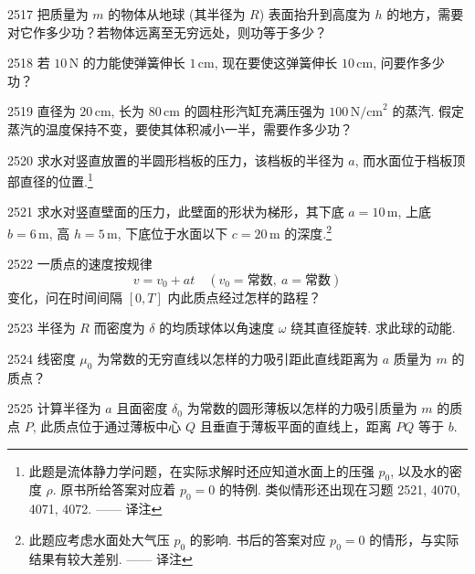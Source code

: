 \begin{prob}[M]{2517}
把质量为 $m$ 的物体从地球 (其半径为 $R$) 表面抬升到高度为 $h$ 的地方，需要对它作多少功？若物体远离至无穷远处，则功等于多少？
\end{prob}

\begin{prob}[M]{2518}
若 $10\,\mathrm{N}$ 的力能使弹簧伸长 $1\,\mathrm{cm}$, 现在要使这弹簧伸长 $10\,\mathrm{cm}$, 问要作多少功？
\end{prob}

\begin{prob}[M]{2519}
直径为 $20\,\mathrm{cm}$, 长为 $80\,\mathrm{cm}$ 的圆柱形汽缸充满压强为 $100\,\mathrm{N/cm}^2$ 的蒸汽. 假定蒸汽的温度保持不变，要使其体积减小一半，需要作多少功？
\end{prob}

\begin{prob}[M]{2520}
求水对竖直放置的半圆形档板的压力，该档板的半径为 $a$, 而水面位于档板顶部直径的位置.\footnote{此题是流体静力学问题，在实际求解时还应知道水面上的压强 $p_0$, 以及水的密度 $\rho$. 原书所给答案对应着 $p_0 = 0$ 的特例. 类似情形还出现在习题 2521, 4070, 4071, 4072. —— 译注}
\end{prob}

\begin{prob}[M]{2521}
求水对竖直壁面的压力，此壁面的形状为梯形，其下底 $a = 10\,\mathrm{m}$, 上底 $b = 6\,\mathrm{m}$, 高 $h = 5\,\mathrm{m}$, 下底位于水面以下 $c = 20\,\mathrm{m}$ 的深度.\footnote{此题应考虑水面处大气压 $p_0$ 的影响. 书后的答案对应 $p_0 = 0$ 的情形，与实际结果有较大差别. —— 译注}
\end{prob}


\begin{prob}[M]{2522}
一质点的速度按规律
\[
v = v_0 + at \quad (v_0 = \text{常数}, \ a = \text{常数})
\]
变化，问在时间间隔 $[0, T]$ 内此质点经过怎样的路程？
\end{prob}

\begin{prob}[M]{2523}
半径为 $R$ 而密度为 $\delta$ 的均质球体以角速度 $\omega$ 绕其直径旋转. 求此球的动能.
\end{prob}

\begin{prob}[M]{2524}
线密度 $\mu_0$ 为常数的无穷直线以怎样的力吸引距此直线距离为 $a$ 质量为 $m$ 的质点？
\end{prob}

\begin{prob}[M]{2525}
计算半径为 $a$ 且面密度 $\delta_0$ 为常数的圆形薄板以怎样的力吸引质量为 $m$ 的质点 $P$, 此质点位于通过薄板中心 $Q$ 且垂直于薄板平面的直线上，距离 $PQ$ 等于 $b$.
\end{prob}

